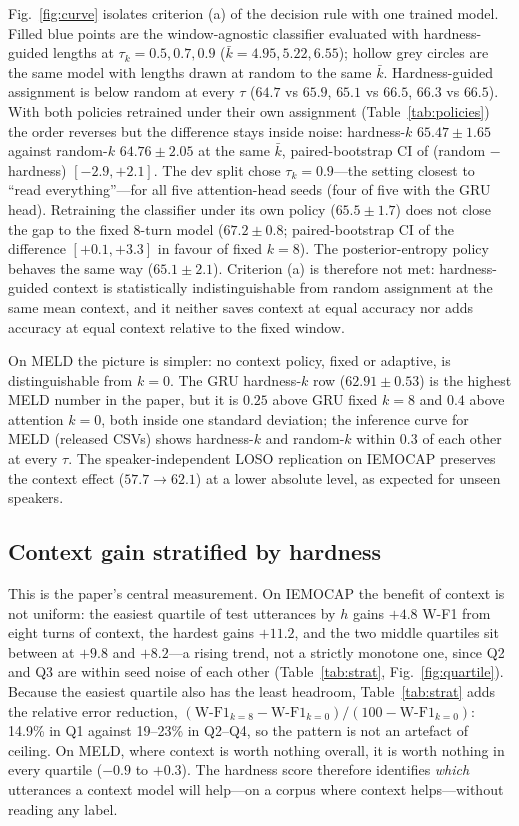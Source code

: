 \documentclass[journal]{IEEEtran}
\newcommand{\wf}{W-F1}
\newcommand{\kbar}{\bar{k}}
\begin{document}
Fig.~\ref{fig:curve} isolates criterion (a) of the decision rule with one trained model. Filled blue points are the window-agnostic classifier evaluated with hardness-guided lengths at $\tau_k = 0.5, 0.7, 0.9$ ($\kbar = 4.95, 5.22, 6.55$); hollow grey circles are the same model with lengths drawn at random to the same $\kbar$. Hardness-guided assignment is below random at every $\tau$ ($64.7$ vs $65.9$, $65.1$ vs $66.5$, $66.3$ vs $66.5$). With both policies retrained under their own assignment (Table~\ref{tab:policies}) the order reverses but the difference stays inside noise: hardness-$k$ $65.47 \pm 1.65$ against random-$k$ $64.76 \pm 2.05$ at the same $\kbar$, paired-bootstrap CI of (random $-$ hardness) $[-2.9, +2.1]$. The dev split chose $\tau_k = 0.9$---the setting closest to ``read everything''---for all five attention-head seeds (four of five with the GRU head). Retraining the classifier under its own policy ($65.5 \pm 1.7$) does not close the gap to the fixed 8-turn model ($67.2 \pm 0.8$; paired-bootstrap CI of the difference $[+0.1, +3.3]$ in favour of fixed $k = 8$). The posterior-entropy policy behaves the same way ($65.1 \pm 2.1$). Criterion (a) is therefore not met: hardness-guided context is statistically indistinguishable from random assignment at the same mean context, and it neither saves context at equal accuracy nor adds accuracy at equal context relative to the fixed window.

On MELD the picture is simpler: no context policy, fixed or adaptive, is distinguishable from $k = 0$. The GRU hardness-$k$ row ($62.91 \pm 0.53$) is the highest MELD number in the paper, but it is $0.25$ above GRU fixed $k = 8$ and $0.4$ above attention $k = 0$, both inside one standard deviation; the inference curve for MELD (released CSVs) shows hardness-$k$ and random-$k$ within $0.3$ of each other at every $\tau$. The speaker-independent LOSO replication on IEMOCAP preserves the context effect ($57.7 \rightarrow 62.1$) at a lower absolute level, as expected for unseen speakers.

\subsection{Context gain stratified by hardness}\label{sec:strat}
This is the paper's central measurement. On IEMOCAP the benefit of context is not uniform: the easiest quartile of test utterances by $h$ gains $+4.8$ \wf{} from eight turns of context, the hardest gains $+11.2$, and the two middle quartiles sit between at $+9.8$ and $+8.2$---a rising trend, not a strictly monotone one, since Q2 and Q3 are within seed noise of each other (Table~\ref{tab:strat}, Fig.~\ref{fig:quartile}). Because the easiest quartile also has the least headroom, Table~\ref{tab:strat} adds the relative error reduction, $(\text{\wf}_{k=8} - \text{\wf}_{k=0})/(100 - \text{\wf}_{k=0})$: 14.9\% in Q1 against 19--23\% in Q2--Q4, so the pattern is not an artefact of ceiling. On MELD, where context is worth nothing overall, it is worth nothing in every quartile ($-0.9$ to $+0.3$). The hardness score therefore identifies \emph{which} utterances a context model will help---on a corpus where context helps---without reading any label.
\end{document}
